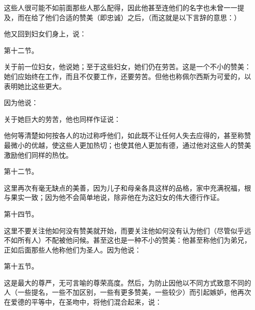这些人很可能不如前面那些人那么配得，因此他甚至连他们的名字也未曾一一提及，而在给了他们合适的赞美（即忠诚）之后，（而这就是以下言辞的意思：）\par

\par

他又回到妇女们身上，说：\par

第十二节。\par

关于前一位妇女，他说她；至于这些妇女，她们仍在劳苦。这是一个不小的赞美：她们应始终在工作，而且不仅要工作，还要劳苦。但他也称佩尔西斯为可爱的，以表明她比这些更大。\par

因为他说：\par

关于她巨大的劳苦，他也同样作证说：\par

他何等清楚如何按各人的功过称呼他们，如此既不让任何人失去应得的，甚至称赞最微小的优越，使这些人更加热切；也使其他人更加有德，通过他对这些人的赞美激励他们同样的热忱。\par

第十二节。\par

这里再次有毫无缺点的美善，因为儿子和母亲各具这样的品格，家中充满祝福，根与果实一致；因为他不会简单地说，除非他在为这妇女的伟大德行作证。\par

第十四节。\par

这里不要关注他如何没有赞美就开始，而要关注他如何没有认为他们（尽管似乎远不如所有人）不配被他问候。甚至这也是一种不小的赞美：他甚至称他们为弟兄，正如后面那些人他称他们为圣人。因为他说：\par

第十五节。\par

这是最大的尊严，无可言喻的尊荣高度。然后，为防止因他以不同方式致意不同的人（一些提名，一些不加区别，一些有更多赞美，一些较少）而引起嫉妒，他再次在爱德的平等中，在圣吻中，将他们混合起来，说：\par

